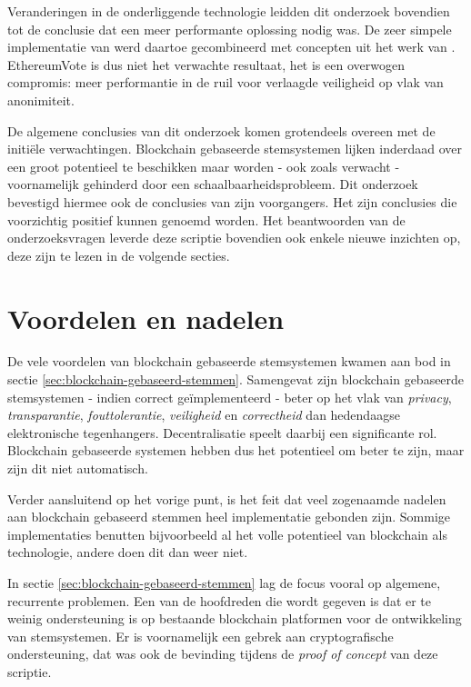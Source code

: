 Veranderingen in de onderliggende technologie leidden dit onderzoek bovendien tot de conclusie dat een meer performante oplossing nodig was. De zeer simpele implementatie van \textcite{McCubin2019} werd daartoe gecombineerd met concepten uit het werk van \textcite{McCorry2017}. EthereumVote is dus niet het verwachte resultaat, het is een overwogen compromis: meer performantie in de ruil voor verlaagde veiligheid op vlak van anonimiteit. 

De algemene conclusies van dit onderzoek komen grotendeels overeen met de initiële verwachtingen.  Blockchain gebaseerde stemsystemen lijken inderdaad over een groot potentieel te beschikken maar worden - ook zoals verwacht - voornamelijk gehinderd  door een schaalbaarheidsprobleem. Dit onderzoek bevestigd hiermee ook de conclusies van zijn voorgangers. Het zijn conclusies die voorzichtig positief kunnen genoemd worden. Het beantwoorden van de onderzoeksvragen leverde deze scriptie bovendien ook enkele nieuwe inzichten op, deze zijn te lezen in de volgende secties.
\section{Voordelen en nadelen}
De vele voordelen van blockchain gebaseerde stemsystemen kwamen aan bod in sectie \ref{sec:blockchain-gebaseerd-stemmen}. Samengevat zijn blockchain gebaseerde stemsystemen  - indien correct geïmplementeerd - beter op het vlak van \textit{privacy}, \textit{transparantie},  \textit{fouttolerantie},  \textit{veiligheid} en \textit{correctheid} dan hedendaagse elektronische tegenhangers. Decentralisatie speelt daarbij een significante rol. Blockchain gebaseerde systemen hebben dus het potentieel om beter te zijn, maar zijn dit niet automatisch.
	
Verder aansluitend op het vorige punt, is het feit dat veel zogenaamde nadelen aan blockchain gebaseerd stemmen heel implementatie gebonden zijn. Sommige implementaties benutten bijvoorbeeld al het volle potentieel van blockchain als technologie, andere doen dit dan weer niet. 

In sectie \ref{sec:blockchain-gebaseerd-stemmen} lag de focus vooral op algemene, recurrente problemen. Een van de hoofdreden die  wordt gegeven is dat er te weinig ondersteuning is op bestaande blockchain platformen voor de ontwikkeling van stemsystemen. Er is voornamelijk een gebrek aan cryptografische ondersteuning, dat was ook de bevinding tijdens de \textit{proof of concept} van deze scriptie.
	
